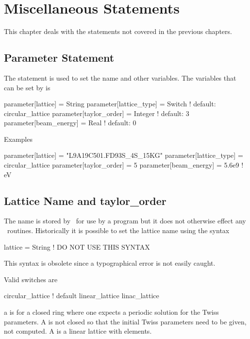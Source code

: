 \chapter{Miscellaneous Statements}

This chapter deals with the statements not covered in the previous chapters.

\section{Parameter Statement}
\label{s:parameter}

The  statement is used to set the  name and other variables. 
The variables that can be set by  is
\begin{example}
  parameter[lattice]      = String 
  parameter[lattice_type] = Switch      ! default: circular_lattice
  parameter[taylor_order] = Integer     ! default: 3
  parameter[beam_energy]  = Real        ! default: 0
\end{example}

\noindent
Examples
\begin{example}
  parameter[lattice]      = "L9A19C501.FD93S_4S_15KG"
  parameter[lattice_type] = circular_lattice
  parameter[taylor_order] = 5
  parameter[beam_energy]  = 5.6e9    ! eV
\end{example}

\section{Lattice Name and taylor\_order}
\label{s:beam}

The  name is stored by \bmad\ for use by a program but it does
not otherwise effect any \bmad\ routines. 
Historically it is possible to set the lattice name using the syntax
\begin{example}
  lattice = String   ! DO NOT USE THIS SYNTAX
\end{example}
This syntax is obsolete since a typographical error is not easily caught.

\noindent
Valid  switches are
\begin{example}
  circular_lattice  ! default
  linear_lattice
  linac_lattice
\end{example}
a  is for a closed ring where one expects a periodic
solution for the Twiss parameters. A  is not closed
so that the initial Twiss parameters need to be given, not computed. A
 is a linear lattice with  elements.

